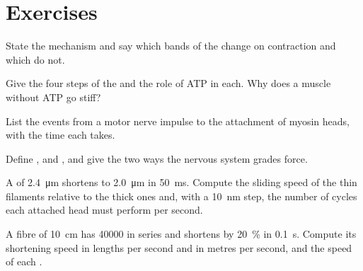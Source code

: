 \section{Exercises}

\begin{exercise}[$\star$]\label{exo:b2:muscle-movement:1}
State the  mechanism and say which bands of the
 change on contraction and which do not.
\end{exercise}

\begin{exercise}[$\star$]\label{exo:b2:muscle-movement:2}
Give the four steps of the  and the role of ATP
in each. Why does a muscle without ATP go stiff?
\end{exercise}

\begin{exercise}[$\star$]\label{exo:b2:muscle-movement:3}
List the events from a motor nerve impulse to the attachment of
myosin heads, with the time each takes.
\end{exercise}

\begin{exercise}[$\star$]\label{exo:b2:muscle-movement:4}
Define ,  and , and give the two ways the
nervous system grades force.
\end{exercise}

\begin{exercise}[$\star\star$]\label{exo:b2:muscle-movement:5}
A  of \qty{2.4}{\micro m} shortens to \qty{2.0}{\micro m} in
\qty{50}{ms}. Compute the sliding speed of the thin filaments
relative to the thick ones and, with a \qty{10}{nm} step, the number
of cycles each attached head must perform per second.
\end{exercise}

\begin{exercise}[$\star\star$]\label{exo:b2:muscle-movement:6}
A fibre of \qty{10}{cm} has \num{40000}  in series and
shortens by \qty{20}{\%} in \qty{0.1}{s}. Compute its shortening speed
in lengths per second and in metres per second, and the speed of
each .
\end{exercise}

